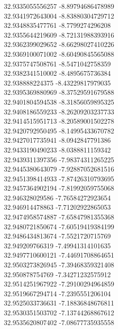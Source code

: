 {32.9335055556257	-8.89794686478989\\
32.9341972643004	-8.83880304729712\\
32.9348835477761	-8.7799274296208\\
32.9355644219609	-8.72131988393916\\
32.9362399029652	-8.66298027410226\\
32.9369100071002	-8.60490845565088\\
32.9375747508761	-8.5471042758359\\
32.9382341510002	-8.4895675736384\\
32.938888224375	-8.43229817979035\\
32.9395369880969	-8.37529591679588\\
32.9401804594538	-8.31856059895325\\
32.9408186559233	-8.26209203237733\\
32.9414515951713	-8.20589001502278\\
32.9420792950495	-8.14995433670782\\
32.9427017735941	-8.0942847791386\\
32.9433190490233	-8.0388811159342\\
32.9439311397356	-7.98374311265225\\
32.9445380643079	-7.92887052681516\\
32.9451398414933	-7.87426310793695\\
32.9457364902194	-7.81992059755068\\
32.946328029586	-7.76584272923654\\
32.946914478863	-7.71202922865053\\
32.9474958574887	-7.65847981355368\\
32.9480721850674	-7.60519419384199\\
32.9486434813674	-7.5521720715769\\
32.949209766319	-7.49941314101635\\
32.9497710600121	-7.44691708864651\\
32.9503273826945	-7.39468359321408\\
32.950878754769	-7.34271232575912\\
32.9514251967922	-7.29100294964859\\
32.9519667294714	-7.2395551206104\\
32.9525033736631	-7.18836848676811\\
32.9530351503702	-7.13744268867612\\
32.9535620807402	-7.08677735935558\\
}

